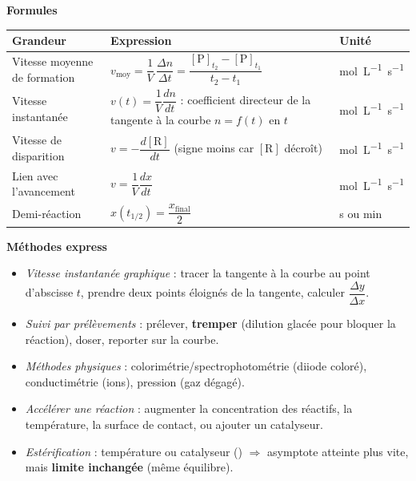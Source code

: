 \documentclass[11pt]{article}
\begin{document}
\begin{bilan}
\textbf{Formules}
\begin{center}
\begin{tabularx}{\linewidth}{|l|X|l|}
\hline
\rowcolor{popblueL} \textbf{Grandeur} & \textbf{Expression} & \textbf{Unité} \\
\hline
Vitesse moyenne de formation & $v_{\text{moy}} = \dfrac{1}{V}\,\dfrac{\Delta n}{\Delta t} = \dfrac{[\text{P}]_{t_2}-[\text{P}]_{t_1}}{t_2-t_1}$ & \si{mol.L^{-1}.s^{-1}} \\
\hline
Vitesse instantanée & $v(t) = \dfrac{1}{V}\dfrac{dn}{dt}$ : coefficient directeur de la tangente à la courbe $n=f(t)$ en $t$ & \si{mol.L^{-1}.s^{-1}} \\
\hline
Vitesse de disparition & $v = -\dfrac{d[\text{R}]}{dt}$ (signe moins car $[\text{R}]$ décroît) & \si{mol.L^{-1}.s^{-1}} \\
\hline
Lien avec l'avancement & $v = \dfrac{1}{V}\dfrac{dx}{dt}$ & \si{mol.L^{-1}.s^{-1}} \\
\hline
Demi-réaction & $x(t_{1/2}) = \dfrac{x_{\text{final}}}{2}$ & \si{s} ou \si{min} \\
\hline
\end{tabularx}
\end{center}

\textbf{Méthodes express}
\begin{itemize}
  \item \emph{Vitesse instantanée graphique} : tracer la tangente à la courbe au point d'abscisse $t$, prendre deux points éloignés de la tangente, calculer $\dfrac{\Delta y}{\Delta x}$.
  \item \emph{Suivi par prélèvements} : prélever, \textbf{tremper} (dilution glacée pour bloquer la réaction), doser, reporter sur la courbe.
  \item \emph{Méthodes physiques} : colorimétrie/spectrophotométrie (diiode coloré), conductimétrie (ions), pression (gaz dégagé).
  \item \emph{Accélérer une réaction} : augmenter la concentration des réactifs, la température, la surface de contact, ou ajouter un catalyseur.
  \item \emph{Estérification} : température ou catalyseur () $\Rightarrow$ asymptote atteinte plus vite, mais \textbf{limite inchangée} (même équilibre).
\end{itemize}
\end{bilan}
\end{document}
